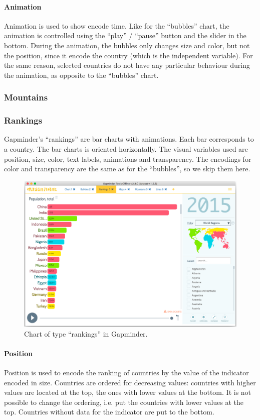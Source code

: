 \paragraph{Animation}
Animation is used to show encode time.
Like for the ``bubbles'' chart, the animation is controlled using the ``play'' / ``pause'' button and the slider in the bottom.
During the animation, the bubbles only changes size and color, but not the position, since it encode the country (which is the independent variable).
For the same reason, selected countries do not have any particular behaviour during the animation, as opposite to the ``bubbles'' chart.


\subsubsection{Mountains}


\subsubsection{Rankings}
Gapminder's ``rankings'' are bar charts with animations.
Each bar corresponds to a country.
The bar charts is oriented horizontally.
The visual variables used are position, size, color, text labels, animations and transparency.
The encodings for color and transparency are the same as for the ``bubbles'', so we skip them here.

\begin{figure}[h]
	\centering
	\includegraphics[width=0.95\columnwidth]{figures/rankings}
	\caption{Chart of type ``rankings'' in Gapminder.}
	\label{fig:rankings}
\end{figure}


\paragraph{Position}
Position is used to encode the ranking of countries by the value of the indicator encoded in size.
Countries are ordered for decreasing values:
countries with higher values are located at the top, the ones with lower values at the bottom.
It is not possible to change the ordering, i.e. put the countries with lower values at the top.
Countries without data for the indicator are put to the bottom.

